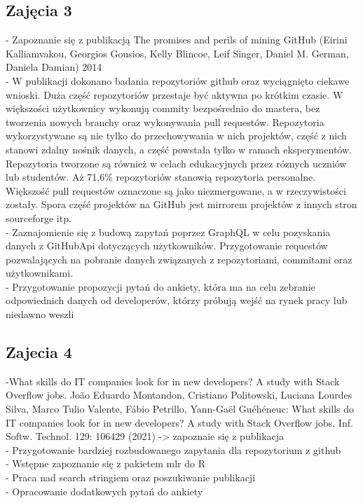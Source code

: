 \documentclass[graybox]{svmult}
\begin{document}
\subsection{Zajęcia 3}
- Zapoznanie się z publikacją The promises and perils of mining GitHub (Eirini Kalliamvakou, Georgios Gousios, Kelly Blincoe, Leif Singer, Daniel M. German, Daniela Damian) 2014
\\- W publikacji dokonano badania repozytoriów github oraz wyciągnięto ciekawe wnioski. Duża część repozytoriów przestaje być aktywna po krótkim czasie. W większości użytkownicy wykonują commity bezpośrednio do mastera, bez tworzenia nowych branchy oraz wykonywania pull requestów. Repozytoria wykorzystywane są nie tylko do przechowywania w nich projektów, część z nich stanowi zdalny nośnik danych, a część powstała tylko w ramach eksperymentów. Repozytoria tworzone są również w celach edukacyjnych przez róznych uczniów lub studentów. Aż 71,6\% repozytoriów stanowią repozytoria personalne. Większość pull requestów oznaczone są jako niezmergowane, a w rzeczywistości zostały. Spora część projektów na GitHub jest mirrorem projektów z innych stron sourceforge itp.
\\ - Zaznajomienie się z budową zapytań poprzez GraphQL w celu pozyskania danych z GitHubApi dotyczących użytkowników. Przygotowanie requestów pozwalających na pobranie danych związanych z repozytoriami, commitami oraz użytkownikami. 
\\ - Przygotowanie propozycji pytań do ankiety, która ma na celu zebranie odpowiednich danych od developerów, którzy próbują wejść na rynek pracy lub niedawno weszli
\subsection{Zajecia 4}
-What skills do IT companies look for in new developers? A study with Stack Overflow jobs.
João Eduardo Montandon, Cristiano Politowski, Luciana Lourdes Silva, Marco Tulio Valente, Fábio Petrillo, Yann-Gaël Guéhéneuc:
What skills do IT companies look for in new developers? A study with Stack Overflow jobs. Inf. Softw. Technol. 129: 106429 (2021) -> zapoznaie się z publikacja
\\- Przygotowanie bardziej rozbudowanego zapytania dla repozytorium z github
\\- Wstępne zapoznanie się z pakietem mlr do R
\\- Praca nad search stringiem oraz poszukiwanie publikacji
\\- Opracowanie dodatkowych pytań do ankiety 
\end{document}
